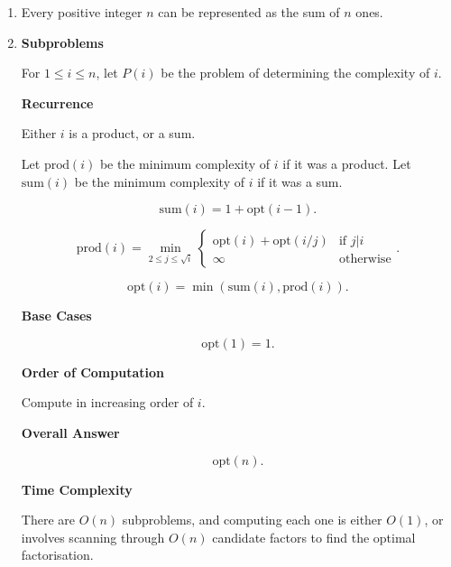 \documentclass{article}
\begin{document}
\begin{solution}
\begin{enumerate}[label = (\alph*)]
    \item Every positive integer $n$ can be represented as the sum of $n$ ones.

    \item 

    \textbf{Subproblems}

For $1\leq i\leq n$, let $P(i)$ be the problem of determining the 
complexity of $i$.

\textbf{Recurrence}

Either $i$ is a product, or a sum.

Let $\mathrm{prod}(i)$ be the minimum complexity of $i$ if it was a product.
Let $\mathrm{sum}(i)$ be the minimum complexity of $i$ if it was a sum.

$$
\mathrm{sum}(i) = 1 + \mathrm{opt}(i-1).
$$

$$
\mathrm{prod}(i) = \min_{2\leq j\leq \sqrt{i}}\begin{cases}
    \mathrm{opt}(i) + \mathrm{opt}(i/j) &\text{if $j|i$}\\
    \infty &\text{otherwise}
\end{cases}.
$$

$$
\mathrm{opt}(i)=\min(\mathrm{sum}(i), \mathrm{prod}(i)).
$$

\textbf{Base Cases}

$$\mathrm{opt}(1)=1.$$

\textbf{Order of Computation}

Compute in increasing order of $i$.

\pagebreak

\textbf{Overall Answer}

$$\mathrm{opt}(n).$$

\textbf{Time Complexity}

There are $O(n)$ subproblems, and computing each one is either $O(1)$, or involves scanning through $O(n)$
candidate factors to find the optimal factorisation.


\end{enumerate}
\end{solution}
\end{document}
